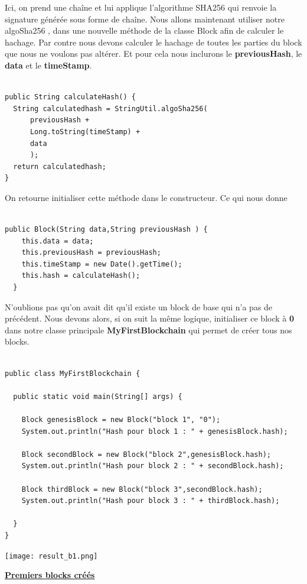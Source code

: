 \documentclass[12pt]{report}
\begin{document}
Ici, on prend une chaîne et lui applique l'algorithme SHA256 qui renvoie la signature générée sous forme de chaîne. Nous allons maintenant utiliser notre algoSha256 , dans une nouvelle méthode de la classe Block afin de calculer le hachage. Par contre nous devons calculer le hachage de toutes les parties du block que nous ne voulons pas altérer. Et pour cela nous inclurons le \textbf{previousHash}, le \textbf{data} et le \textbf{timeStamp}.

\begin{lstlisting}

public String calculateHash() {
  String calculatedhash = StringUtil.algoSha256( 
      previousHash +
      Long.toString(timeStamp) +
      data 
      );
  return calculatedhash;
}
\end{lstlisting}

On retourne initialiser cette méthode dans le constructeur. Ce qui nous donne 

\begin{lstlisting}

public Block(String data,String previousHash ) {
    this.data = data;
    this.previousHash = previousHash;
    this.timeStamp = new Date().getTime();
    this.hash = calculateHash(); 
  }
\end{lstlisting}

N'oublions pas qu'on avait dit qu'il existe un block de base qui n'a pas de précédent. Nous devons alors, si on suit la même logique, initialiser ce block à \textbf{0} dans notre classe principale \textbf{MyFirstBlockchain} qui permet de créer tous nos blocks.

\begin{lstlisting}

public class MyFirstBlockchain {

  public static void main(String[] args) {

    Block genesisBlock = new Block("block 1", "0");
    System.out.println("Hash pour block 1 : " + genesisBlock.hash);
		
    Block secondBlock = new Block("block 2",genesisBlock.hash);
    System.out.println("Hash pour block 2 : " + secondBlock.hash);
		
    Block thirdBlock = new Block("block 3",secondBlock.hash);
    System.out.println("Hash pour block 3 : " + thirdBlock.hash);
		
  }
}

\end{lstlisting}


\texttt{[image: result\_b1.png]}
\begin{center}
   \textbf{\underline{Premiers blocks créés}} \\[1cm]
\end{center}
\end{document}

